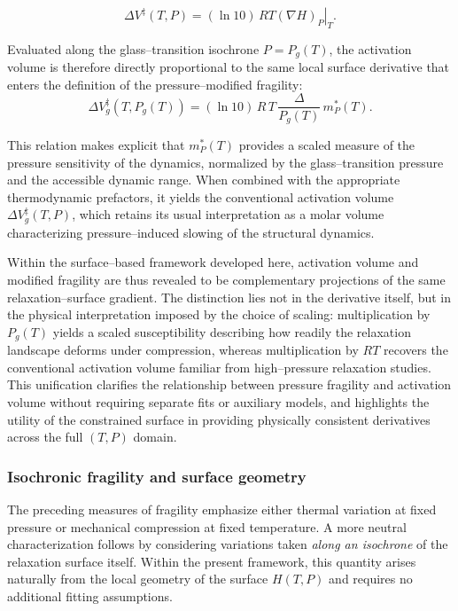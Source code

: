 \begin{equation}
	\Delta V^{\ddagger}(T,P)
	=
	(\ln 10)\,RT
	\left.
	(\nabla H)_P
	\right|_{T}.
\end{equation}

Evaluated along the glass--transition isochrone $P=P_{g}(T)$, the activation volume is therefore
directly proportional to the same local surface derivative that enters the definition of the
pressure--modified fragility:
\begin{equation}
	\Delta V^{\ddagger}_{g}\!\left(T,P_{g}(T)\right)
	=
	(\ln 10)\,R\,T\,
	\frac{\Delta}{P_{g}(T)}\,
	m^{*}_{P}(T).
	\label{eqn:mpstar_activationVolume}
\end{equation}

This relation makes explicit that $m^{*}_{P}(T)$ provides a scaled measure of the pressure sensitivity of the dynamics, normalized by the glass--transition pressure and the accessible dynamic range. When combined with the appropriate thermodynamic prefactors, it yields the conventional activation volume $\Delta V^{\ddagger}_{g}(T,P)$, which retains its usual interpretation as a molar volume characterizing pressure--induced slowing of the structural dynamics.

Within the surface--based framework developed here, activation volume and modified fragility are
thus revealed to be complementary projections of the same relaxation--surface gradient.
The distinction lies not in the derivative itself, but in the physical interpretation imposed by the
choice of scaling: multiplication by $P_{g}(T)$ yields a scaled susceptibility describing how
readily the relaxation landscape deforms under compression, whereas multiplication by $RT$
recovers the conventional activation volume familiar from high--pressure relaxation studies.
This unification clarifies the relationship between pressure fragility and activation volume without
requiring separate fits or auxiliary models, and highlights the utility of the constrained surface in
providing physically consistent derivatives across the full $(T,P)$ domain.

\subsubsection*{Isochronic fragility and surface geometry}

The preceding measures of fragility emphasize either thermal variation at fixed pressure or mechanical compression at fixed temperature. A more neutral characterization follows by considering variations taken \emph{along an isochrone} of the relaxation surface itself. Within the present framework, this quantity arises naturally from the local geometry of the surface $H(T,P)$ and requires no additional fitting assumptions.


